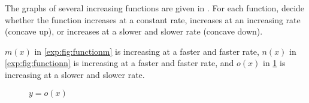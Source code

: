 \begin{problem}
\begin{subproblem} \label{exp:prob:graphsofincreasingfunctions}
	The graphs of several increasing functions are given in .  
	For each function, decide whether the function increases at a constant rate, increases at an increasing 
	rate (concave up), or increases at a slower and slower rate (concave down).
	\begin{shortsolution}
		$m(x)$ in \cref{exp:fig:functionm} is increasing at a faster and faster rate, 
		$n(x)$ in \cref{exp:fig:functionn} is increasing at a faster and faster rate, 
		and $o(x)$ in \cref{exp:fig:functiono} is increasing at a slower and slower rate.
	\end{shortsolution}
\end{subproblem}

\begin{figure}[!htb]
	\mbox{}\hfill
	\begin{minipage}{.25\textwidth}
		\caption{$y=m(x)$}
		\label{exp:fig:functionm}
	\end{minipage}%
	\hfill
	\begin{minipage}{.25\textwidth}
		\centering
		\caption{$y=n(x)$}
		\label{exp:fig:functionn}
	\end{minipage}%
	\hfill
	\begin{minipage}{.25\textwidth}
		\centering
		\caption{$y=o(x)$}
		\label{exp:fig:functiono}
	\end{minipage}
	\hfill
	\mbox{}
\end{figure}


\end{problem}
